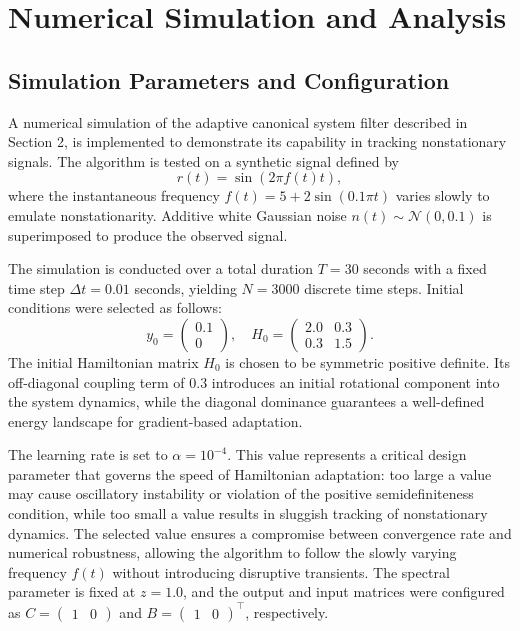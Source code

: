 \documentclass[reqno]{amsart}
\numberwithin{equation}{section}
\begin{document}
\section{Numerical Simulation and Analysis}
\label{sec:simulation}

\subsection*{Simulation Parameters and Configuration}

A numerical simulation of the adaptive canonical system filter described in Section 2, is implemented to demonstrate its capability in tracking nonstationary signals. The algorithm is tested on a synthetic signal defined by
\begin{equation}
r(t) = \sin(2 \pi f(t) t),
\end{equation}
where the instantaneous frequency \(f(t) = 5 + 2 \sin(0.1 \pi t)\) varies slowly to emulate nonstationarity. Additive white Gaussian noise \(n(t) \sim \mathcal{N}(0, 0.1)\) is superimposed to produce the observed signal.

The simulation is conducted over a total duration \(T = 30\) seconds with a fixed time step \(\Delta t = 0.01\) seconds, yielding \(N = 3000\) discrete time steps. Initial conditions were selected as follows:
\begin{equation}
y_0 = \begin{pmatrix} 0.1 \\ 0 \end{pmatrix}, \quad
H_0 = \begin{pmatrix} 2.0 & 0.3 \\ 0.3 & 1.5 \end{pmatrix}.
\end{equation}
The initial Hamiltonian matrix \(H_0\) is chosen to be symmetric positive definite. Its off-diagonal coupling term of \(0.3\) introduces an initial rotational component into the system dynamics, while the diagonal dominance guarantees a well-defined energy landscape for gradient-based adaptation.

The learning rate is set to \(\alpha = 10^{-4}\). This value represents a critical design parameter that governs the speed of Hamiltonian adaptation: too large a value may cause oscillatory instability or violation of the positive semidefiniteness condition, while too small a value results in sluggish tracking of nonstationary dynamics. The selected value ensures a compromise between convergence rate and numerical robustness, allowing the algorithm to follow the slowly varying frequency \(f(t)\) without introducing disruptive transients. The spectral parameter is fixed at \(z = 1.0\), and the output and input matrices were configured as \(C = \begin{pmatrix} 1 & 0 \end{pmatrix}\) and \(B = \begin{pmatrix} 1 & 0 \end{pmatrix}^\top\), respectively.
\end{document}
